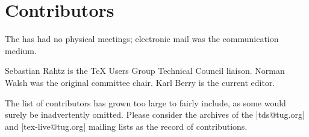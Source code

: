\documentclass{tdsguide}
\begin{document}
\section{Contributors}

The  has had no physical meetings; electronic mail was the
communication medium.

Sebastian Rahtz is the \TeX{} Users Group Technical Council liaison.
Norman Walsh was the original committee chair.  Karl Berry is the
current editor.

The list of contributors has grown too large to fairly include, as some
would surely be inadvertently omitted.  Please consider the archives of
the \email|tds@tug.org| and \email|tex-live@tug.org| mailing lists as
the record of contributions.
\end{document}

